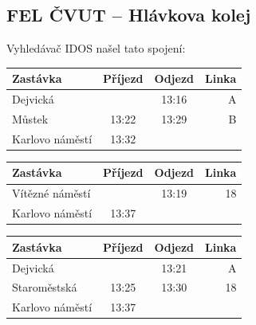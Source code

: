 \subsection{FEL ČVUT -- Hlávkova kolej}
Vyhledávač IDOS našel tato spojení:

\begin{tabular}{|l|c|c|r|}\hline
{\bf Zastávka}&{\bf Příjezd}&{\bf Odjezd}&{\bf Linka}\\\hline
Dejvická&&13:16&A\\\hline
Můstek&13:22&13:29&B\\\hline
Karlovo náměstí&13:32&&\\\hline
\end{tabular} 

\begin{tabular}{|l|c|c|r|}\hline
{\bf Zastávka}&{\bf Příjezd}&{\bf Odjezd}&{\bf Linka}\\\hline
Vítězné náměstí&&13:19&18\\\hline
Karlovo náměstí&13:37&&\\\hline
\end{tabular} 

\begin{tabular}{|l|c|c|r|}\hline
{\bf Zastávka}&{\bf Příjezd}&{\bf Odjezd}&{\bf Linka}\\\hline
Dejvická&&13:21&A\\\hline
Staroměstská&13:25&13:30&18\\\hline
Karlovo náměstí&13:37&&\\\hline
\end{tabular} 

